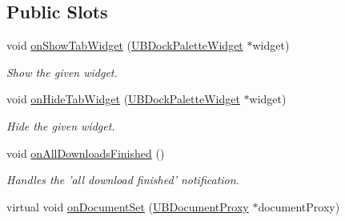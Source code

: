 \subsection*{Public Slots}
\begin{DoxyCompactItemize}
\item 
void \hyperlink{class_u_b_dock_palette_a6018bc6b3b5e572f85428bb0707aa8e1}{on\-Show\-Tab\-Widget} (\hyperlink{class_u_b_dock_palette_widget}{U\-B\-Dock\-Palette\-Widget} $\ast$widget)
\begin{DoxyCompactList}\small\item\em Show the given widget. \end{DoxyCompactList}\item 
void \hyperlink{class_u_b_dock_palette_ad64cbf250c425094fa79d1376c2ce26c}{on\-Hide\-Tab\-Widget} (\hyperlink{class_u_b_dock_palette_widget}{U\-B\-Dock\-Palette\-Widget} $\ast$widget)
\begin{DoxyCompactList}\small\item\em Hide the given widget. \end{DoxyCompactList}\item 
void \hyperlink{class_u_b_dock_palette_af9e632d185248046399cf9e0e615d7d0}{on\-All\-Downloads\-Finished} ()
\begin{DoxyCompactList}\small\item\em Handles the 'all download finished' notification. \end{DoxyCompactList}\item 
virtual void \hyperlink{class_u_b_dock_palette_a952d9fbf7e9757b3662dd9720de20519}{on\-Document\-Set} (\hyperlink{class_u_b_document_proxy}{U\-B\-Document\-Proxy} $\ast$document\-Proxy)
\end{DoxyCompactItemize}
